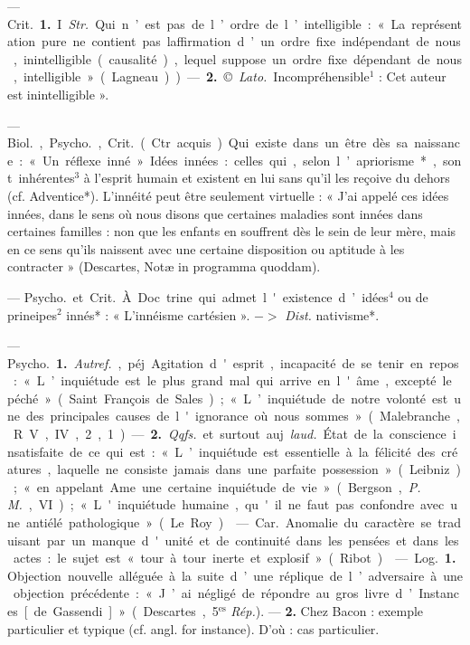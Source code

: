 \begin{itemize}[leftmargin=1cm, label=, itemsep=1pt]
 — \si{Crit.} {\bf 1.} I. {\it Str.} Qui
n’est pas de l’ordre de l’intelligible :
« La représentation pure ne contient
pas laffirmation d’un ordre fixe
indépendant de nous, inintelligible
(causalité), lequel suppose un ordre
fixe dépendant de nous, intelligible » (Lagneau)). — {\bf 2.} ©. {\it Lato.}
Incompréhensible$^1$ : Cet auteur
est inintelligible ».

 — \si{Biol.}, \si{Psycho.}, \si{Crit.} (Ctr.
acquis). Qui existe dans un être dès
sa naissance : « Un réflexe inné ».
Idées innées : celles qui, selon l’apriorisme*, sont inhérentes$^3$ à l'esprit
humain et existent en lui sans qu'il
les reçoive du dehors (cf. Adventice*). L’innéité peut être seulement virtuelle : « J'ai appelé ces
idées innées, dans le sens où nous
disons que certaines maladies sont
innées dans certaines familles : non
que les enfants en souffrent dès le
sein de leur mère, mais en ce sens
qu'ils naissent avec une certaine
disposition ou aptitude à les contracter » (Descartes, Notæ in programma quoddam).

 — \si{Psycho.} et \si{Crit.} À Doc
trine qui admet l'existence d’idées$^4$
ou de prineipes$^2$ innés* : « L’innéisme cartésien ». $->$ {\it Dist.} nativisme*.

 — \si{Psycho.} {\bf 1.} {\it Autref.}, péj.
Agitation d'esprit, incapacité de se
tenir en repos : « L’inquiétude est le
plus grand mal qui arrive en l'âme,
excepté le péché » (Saint François
de Sales); « L’inquiétude de notre
volonté est une des principales
causes de l'ignorance où nous
sommes » (Malebranche, R. V., IV,
2, 1). — {\bf 2.} {\it Qqfs.} et surtout auj.
{\it laud.} État de la conscience insatisfaite de ce qui est : « L’inquiétude
est essentielle à la félicité des créatures, laquelle ne consiste jamais
dans une parfaite possession »
(Leibniz); « ... en appelant Ame une
certaine inquiétude de vie » (Bergson,
{\it P. M.}, VI); « L'inquiétude humaine,
qu'il ne faut pas confondre avec
une antiélé pathologique. » (Le
Roy).

 — \si{Car.} Anomalie
du caractère se traduisant par un
manque d'unité et de continuité
dans les pensées et dans les actes : le
sujet est « tour à tour inerte et
explosif » (Ribot).

 — \si{Log.} {\bf 1.} Objection nouvelle alléguée à la suite d’une réplique de l’adversaire à une objection précédente : « J’ai négligé de
répondre au gros livre d’Instances
[de Gassendi] » (Descartes, 5$^\text{es}$ {\it Rép.}).
— {\bf 2.} Chez Bacon : exemple particulier et typique (cf. angl. for instance). D'où : cas particulier.


\end{itemize}
